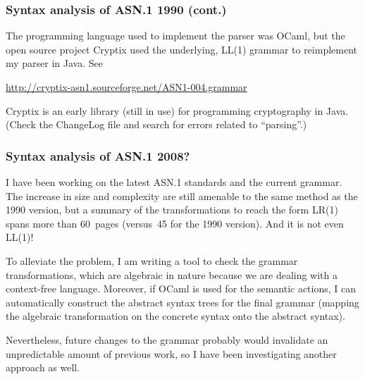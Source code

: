 \documentclass[compress,dvips,xcolor={dvipsnames},t]{beamer}
\newcommand\ASN{\textsf{ASN.1}\xspace}
\begin{document}

\begin{frame}
\frametitle{Syntax analysis of \ASN 1990 (cont.)}

The programming language used to implement the parser was OCaml, but
the open source project Cryptix used the underlying, LL(1) grammar to
reimplement my parser in Java. See

\medskip

{\small\url{http://cryptix-asn1.sourceforge.net/ASN1-004.grammar}}

\medskip

Cryptix is an early library (still in use) for programming
cryptography in Java. (Check the ChangeLog file and search for errors
related to ``parsing''.)

\end{frame}


\begin{frame}
\frametitle{Syntax analysis of \ASN 2008?}

I have been working on the latest \ASN standards and the current
grammar. The increase in size and complexity are still amenable to the
same method as the 1990 version, but a summary of the transformations
to reach the form LR(1) spans more than 60~pages (versus~45 for the
1990 version). And it is not even LL(1)!

\bigskip

To alleviate the problem, I am writing a tool to check the grammar
transformations, which are algebraic in nature because we are dealing
with a context-free language. Moreover, if OCaml is used for the
semantic actions, I can automatically construct the abstract syntax
trees for the final grammar (mapping the algebraic transformation on
the concrete syntax onto the abstract syntax).

\bigskip

Nevertheless, future changes to the grammar probably would invalidate
an unpredictable amount of previous work, so I have been investigating
another approach as well.

\end{frame}

\end{document}
